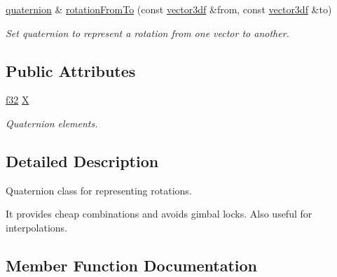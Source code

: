 \begin{DoxyCompactItemize}
\mbox{\label{classirr_1_1core_1_1quaternion_a9da1b3ddfb9722f596a73abf5212c020}} 
\hyperlink{classirr_1_1core_1_1quaternion}{quaternion} \& \hyperlink{classirr_1_1core_1_1quaternion_a9da1b3ddfb9722f596a73abf5212c020}{rotation\+From\+To} (const \hyperlink{namespaceirr_1_1core_a06f169d08b5c429f5575acb7edbad811}{vector3df} \&from, const \hyperlink{namespaceirr_1_1core_a06f169d08b5c429f5575acb7edbad811}{vector3df} \&to)
\begin{DoxyCompactList}\small\item\em Set quaternion to represent a rotation from one vector to another. \end{DoxyCompactList}\end{DoxyCompactItemize}
\subsection*{Public Attributes}
\begin{DoxyCompactItemize}
\item 
\mbox{\label{classirr_1_1core_1_1quaternion_a69f2ee15363f0b9baa0b3cbb70091342}} 
\hyperlink{namespaceirr_a0277be98d67dc26ff93b1a6a1d086b07}{f32} \hyperlink{classirr_1_1core_1_1quaternion_a69f2ee15363f0b9baa0b3cbb70091342}{X}
\begin{DoxyCompactList}\small\item\em Quaternion elements. \end{DoxyCompactList}\end{DoxyCompactItemize}


\subsection{Detailed Description}
Quaternion class for representing rotations. 

It provides cheap combinations and avoids gimbal locks. Also useful for interpolations. 

\subsection{Member Function Documentation}
\mbox{\label{classirr_1_1core_1_1quaternion_ab4f5eb86ef7a42a3021b810486faa8c8}} 
